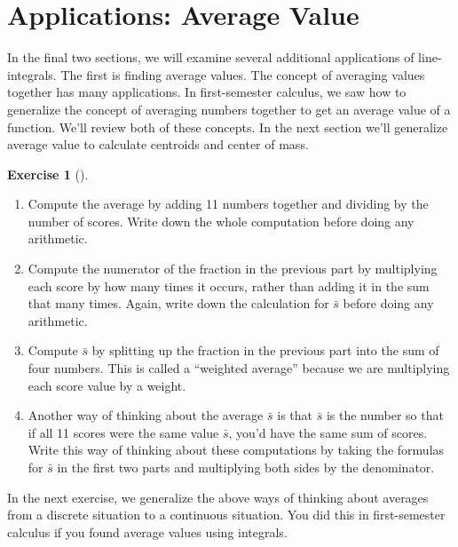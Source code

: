 \documentclass[10pt,]{book}
\theoremstyle{plain}
\theoremstyle{definition}
\theoremstyle{definition}
\theoremstyle{definition}
\theoremstyle{definition}
\newtheorem{exploration}[project]{Exercise}
\theoremstyle{definition}
\numberwithin{equation}{section}
\begin{document}
\section[{Applications: Average Value}]{Applications: Average Value}\label{section-32}
In the final two sections, we will examine several additional applications of line-integrals. The first is finding average values. The concept of averaging values together has many applications. In first-semester calculus, we saw how to generalize the concept of averaging numbers together to get an average value of a function. We'll review both of these concepts. In the next section we'll generalize average value to calculate centroids and center of mass.%
\begin{exploration}[]\label{average_value_methods}
\leavevmode%
\begin{enumerate}[font=\bfseries,label=(\alph*),ref=\alph*]
\item\label{task-539} Compute the average by adding 11 numbers together and dividing by the number of scores.  Write down the whole computation before doing any arithmetic.%
\item\label{task-540} Compute the numerator of the fraction in the previous part by multiplying each score by how many times it occurs, rather than adding it in the sum that many times.  Again, write down the calculation for \(\bar s\) before doing any arithmetic.%
\item\label{task-541} Compute \(\bar s\) by splitting up the fraction in the previous part into the sum of four numbers.  This is called a ``weighted average'' because we are multiplying each score value by a weight.%
\item\label{task-542} Another way of thinking about the average \(\bar s\) is that \(\bar s\) is the number so that if all 11 scores were the same value \(\bar s\), you'd have the same sum of scores.  Write this way of thinking about these computations by taking the formulas for \(\bar s\) in the first two parts and multiplying both sides by the denominator.%
\end{enumerate}
\end{exploration}
In the next exercise, we generalize the above ways of thinking about averages from a discrete situation to a continuous situation. You did this in first-semester calculus if you found average values using integrals.%
\end{document}
